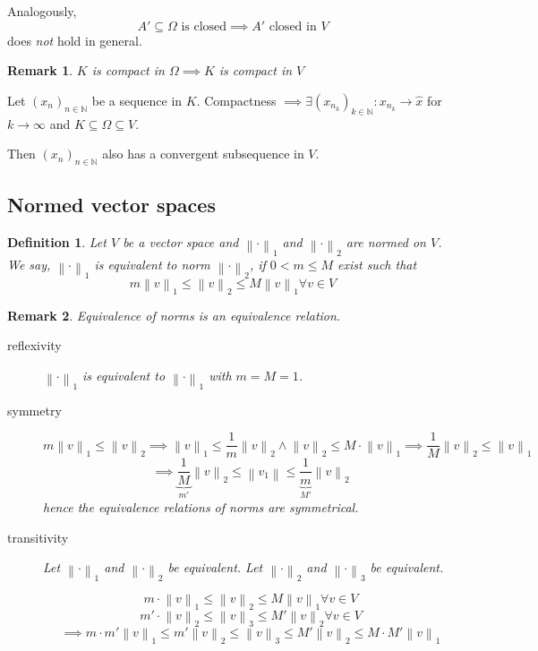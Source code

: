 \documentclass{article}
\newtheorem{definition}{Definition}  \numberwithin{definition}{section}
\newtheorem{remark}{Remark}  \numberwithin{remark}{section}
\newcommand{\norm}[1]{\left\|#1\right\|}
\begin{document}
Analogously,
\[ A' \subseteq \Omega \text{ is closed} \implies A' \text{ closed in } V \]
does \emph{not} hold in general.

\begin{remark}
  $K$ is compact in $\Omega \implies K$ is compact in $V$
\end{remark}

Let $(x_n)_{n \in \mathbb N}$ be a sequence in $K$.
Compactness $\implies \exists (x_{n_k})_{k \in \mathbb N}: x_{n_k} \to \hat{x}$ for $k \to \infty$ and $K \subseteq \Omega \subseteq V$.

Then $(x_n)_{n \in \mathbb N}$ also has a convergent subsequence in $V$.

\subsection{Normed vector spaces}

\begin{definition} %
  Let $V$ be a vector space and $\norm{\cdot}_1$ and $\norm{\cdot}_2$ are normed on $V$.
  We say, $\norm{\cdot}_1$ is equivalent to norm $\norm{\cdot}_2$, if $0 < m \leq M$ exist such that
  \[ m \norm{v}_1 \leq \norm{v}_2 \leq M \norm{v}_1 \forall v \in V \]
\end{definition}

\begin{remark}
  Equivalence of norms is an equivalence relation.
  \begin{description}
    \item[reflexivity]
      $\norm{\cdot}_1$ is equivalent to $\norm{\cdot}_1$ with $m = M = 1$.
    \item[symmetry]
      \[ m \norm{v}_1 \leq \norm{v}_2 \implies \norm{v}_1 \leq \frac1m \norm{v}_2 \land \norm{v}_2 \leq M \cdot \norm{v}_1 \implies \frac1M \norm{v}_2 \leq \norm{v}_1 \]
      \[ \implies \underbrace{\frac1M}_{m'} \norm{v}_2 \leq \norm{v_1} \leq \underbrace{\frac1m}_{M'} \norm{v}_2 \]
      hence the equivalence relations of norms are symmetrical.
    \item[transitivity]
      Let $\norm{\cdot}_1$ and $\norm{\cdot}_2$ be equivalent.
      Let $\norm{\cdot}_2$ and $\norm{\cdot}_3$ be equivalent.

      \[ m \cdot \norm{v}_1 \leq \norm{v}_2 \leq M \norm{v}_1 \forall v \in V \]
      \[ m' \cdot \norm{v}_2 \leq \norm{v}_3 \leq M' \norm{v}_2 \forall v \in V \]
      \[ \implies m \cdot m' \norm{v}_1 \leq m' \norm{v}_2 \leq \norm{v}_3 \leq M' \norm{v}_2 \leq M \cdot M' \norm{v}_1 \]
  \end{description}
\end{remark}
\end{document}
